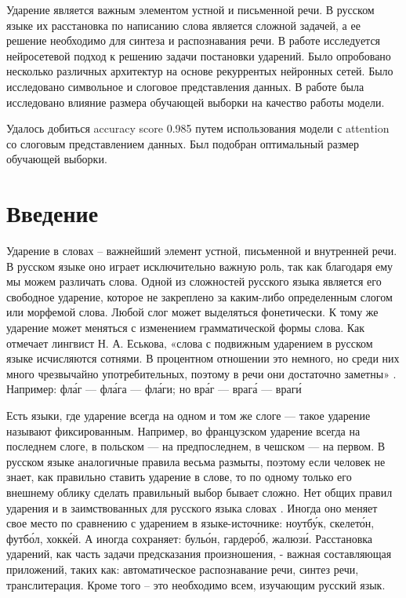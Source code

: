 \documentclass[14pt, a4paper, russian]{extreport}
\begin{document}
Ударение является важным элементом устной и письменной речи. В русском языке их расстановка по написанию слова является сложной задачей, а ее решение необходимо для синтеза и распознавания речи. В работе исследуется нейросетевой подход к решению задачи постановки ударений. Было опробовано несколько различных архитектур на основе рекуррентых нейронных сетей. Было исследовано символьное и слоговое представления данных. В работе была исследовано влияние размера обучающей выборки на качество работы модели.

Удалось добиться accuracy score 0.985 путем использования модели с attention со слоговым представлением данных. Был подобран оптимальный размер обучающей выборки. 

\tableofcontents{}


\chapter*{Введение}
Ударение в словах – важнейший элемент устной, письменной и внутренней речи. В русском языке оно играет исключительно важную роль, так как благодаря ему мы можем различать слова. Одной из сложностей русского языка является его свободное ударение, которое не закреплено за каким-либо определенным слогом или морфемой слова. Любой слог может выделяться фонетически. К тому же ударение  может меняться с изменением грамматической формы слова. Как отмечает лингвист Н. А. Еськова, «слова с подвижным ударением в русском языке исчисляются сотнями. В процентном отношении это немного, но среди них много чрезвычайно употребительных, поэтому в речи они достаточно заметны» \cite{eskina}. Например: фл\'{а}г — фл\'{а}га — фл\'{а}ги; но вр\'{а}г — враг\'{а} — враг\'{и} 

Есть языки, где ударение  всегда на одном и том же слоге — такое ударение называют фиксированным. Например, во французском ударение всегда на последнем слоге, в польском — на предпоследнем, в чешском — на первом. В русском языке аналогичные правила весьма размыты, поэтому если человек не знает, как правильно ставить ударение в слове, то по одному только его внешнему облику сделать правильный выбор бывает сложно.  Нет общих правил ударения и в заимствованных для русского языка словах . Иногда оно меняет свое место по сравнению с ударением в языке-источнике: ноутб\'{у}к, скелет\'{о}н, футб\'{о}л, хокк\'{е}й. А иногда сохраняет: буль\'{о}н, гардер\'{о}б, жалюз\'{и}.
Расстановка ударений, как часть задачи предсказания произношения, - важная составляющая  приложений, таких как: автоматическое распознавание речи, синтез речи, транслитерация. Кроме того – это необходимо всем, изучающим русский язык.
\end{document}

